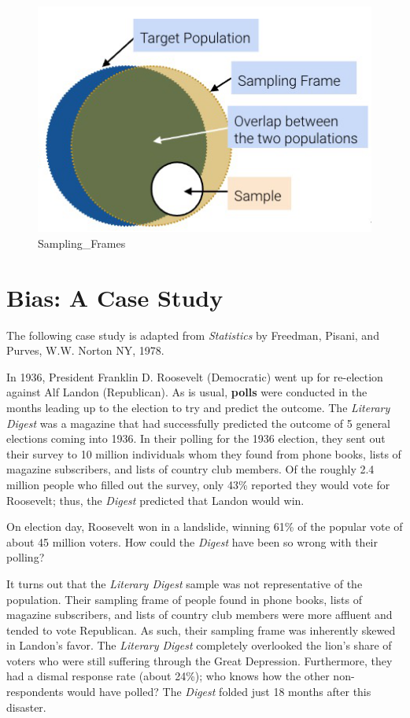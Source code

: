 \documentclass[
  letterpaper,
  DIV=11,
  numbers=noendperiod]{scrreprt}
\begin{document}
\begin{figure}[H]

{\centering \includegraphics{sampling/images/samplingframe.png}

}

\caption{Sampling\_Frames}

\end{figure}%

\section{Bias: A Case Study}\label{bias-a-case-study}

The following case study is adapted from \emph{Statistics} by Freedman,
Pisani, and Purves, W.W. Norton NY, 1978.

In 1936, President Franklin D. Roosevelt (Democratic) went up for
re-election against Alf Landon (Republican). As is usual, \textbf{polls}
were conducted in the months leading up to the election to try and
predict the outcome. The \emph{Literary Digest} was a magazine that had
successfully predicted the outcome of 5 general elections coming into
1936. In their polling for the 1936 election, they sent out their survey
to 10 million individuals whom they found from phone books, lists of
magazine subscribers, and lists of country club members. Of the roughly
2.4 million people who filled out the survey, only 43\% reported they
would vote for Roosevelt; thus, the \emph{Digest} predicted that Landon
would win.

On election day, Roosevelt won in a landslide, winning 61\% of the
popular vote of about 45 million voters. How could the \emph{Digest}
have been so wrong with their polling?

It turns out that the \emph{Literary Digest} sample was not
representative of the population. Their sampling frame of people found
in phone books, lists of magazine subscribers, and lists of country club
members were more affluent and tended to vote Republican. As such, their
sampling frame was inherently skewed in Landon's favor. The
\emph{Literary Digest} completely overlooked the lion's share of voters
who were still suffering through the Great Depression. Furthermore, they
had a dismal response rate (about 24\%); who knows how the other
non-respondents would have polled? The \emph{Digest} folded just 18
months after this disaster.
\end{document}

